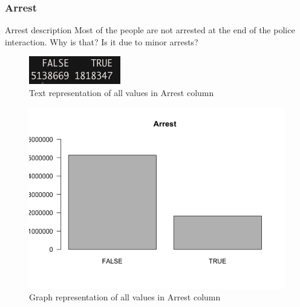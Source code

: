 \newpage
\subsubsection{Arrest}
Arrest description
Most of the people are not arrested at the end of the police interaction. Why is that? Is it due to minor arrests?
\begin{figure}[H]
\includegraphics{images/EDA/Arrest.jpg}
\centering
\caption{Text representation of all values in Arrest column}
\end{figure}
\begin{figure}[H]
\includegraphics[scale=0.65]{images/EDA/Arrest.png}
\centering
\caption{Graph representation of all values in Arrest column}
\end{figure}